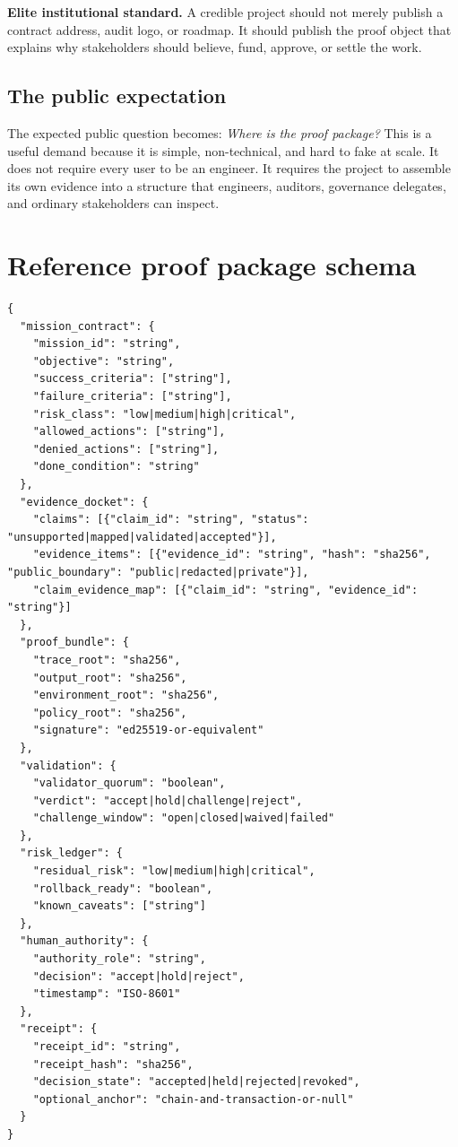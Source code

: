\documentclass[11pt]{article}
\begin{document}
\begin{mandatebox}
\textbf{Elite institutional standard.} A credible project should not merely publish a contract address, audit logo, or roadmap. It should publish the proof object that explains why stakeholders should believe, fund, approve, or settle the work.
\end{mandatebox}

\subsection{The public expectation}

The expected public question becomes: \emph{Where is the proof package?} This is a useful demand because it is simple, non-technical, and hard to fake at scale. It does not require every user to be an engineer. It requires the project to assemble its own evidence into a structure that engineers, auditors, governance delegates, and ordinary stakeholders can inspect.

\section{Reference proof package schema}

\begin{lstlisting}[caption={Minimal public-safe proof package schema.}]
{
  "mission_contract": {
    "mission_id": "string",
    "objective": "string",
    "success_criteria": ["string"],
    "failure_criteria": ["string"],
    "risk_class": "low|medium|high|critical",
    "allowed_actions": ["string"],
    "denied_actions": ["string"],
    "done_condition": "string"
  },
  "evidence_docket": {
    "claims": [{"claim_id": "string", "status": "unsupported|mapped|validated|accepted"}],
    "evidence_items": [{"evidence_id": "string", "hash": "sha256", "public_boundary": "public|redacted|private"}],
    "claim_evidence_map": [{"claim_id": "string", "evidence_id": "string"}]
  },
  "proof_bundle": {
    "trace_root": "sha256",
    "output_root": "sha256",
    "environment_root": "sha256",
    "policy_root": "sha256",
    "signature": "ed25519-or-equivalent"
  },
  "validation": {
    "validator_quorum": "boolean",
    "verdict": "accept|hold|challenge|reject",
    "challenge_window": "open|closed|waived|failed"
  },
  "risk_ledger": {
    "residual_risk": "low|medium|high|critical",
    "rollback_ready": "boolean",
    "known_caveats": ["string"]
  },
  "human_authority": {
    "authority_role": "string",
    "decision": "accept|hold|reject",
    "timestamp": "ISO-8601"
  },
  "receipt": {
    "receipt_id": "string",
    "receipt_hash": "sha256",
    "decision_state": "accepted|held|rejected|revoked",
    "optional_anchor": "chain-and-transaction-or-null"
  }
}
\end{lstlisting}
\end{document}
